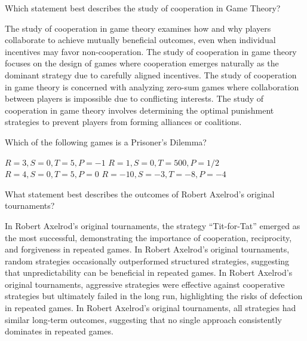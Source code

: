 \documentclass{exam}
\begin{document}
\begin{questions}
        
    \question
    Which statement best describes the study of cooperation in Game Theory?

    \begin{checkboxes}
        \choice The study of cooperation in game theory examines how and why players collaborate to achieve mutually beneficial outcomes, even when individual incentives may favor non-cooperation.
        \choice The study of cooperation in game theory focuses on the design of games where cooperation emerges naturally as the dominant strategy due to carefully aligned incentives.            
        \choice The study of cooperation in game theory is concerned with analyzing zero-sum games where collaboration between players is impossible due to conflicting interests.
        \choice The study of cooperation in game theory involves determining the optimal punishment strategies to prevent players from forming alliances or coalitions.
    \end{checkboxes}

    \question
    Which of the following games is a Prisoner's Dilemma?

    \begin{checkboxes}
        \choice \(R=3, S=0, T=5, P=-1\)
        \choice \(R=1, S=0, T=500, P=1/2\)
        \choice \(R=4, S=0, T=5, P=0\)
        \choice \(R=-10, S=-3, T=-8, P=-4\)
    \end{checkboxes}

    \question What statement best describes the outcomes of Robert Axelrod's
    original tournaments?

    \begin{checkboxes}
        \choice In Robert Axelrod's original tournaments, the strategy ``Tit-for-Tat'' emerged as the most successful, demonstrating the importance of cooperation, reciprocity, and forgiveness in repeated games.
        \choice In Robert Axelrod's original tournaments, random strategies occasionally outperformed structured strategies, suggesting that unpredictability can be beneficial in repeated games.
        \choice In Robert Axelrod's original tournaments, aggressive strategies were effective against cooperative strategies but ultimately failed in the long run, highlighting the risks of defection in repeated games.
        \choice In Robert Axelrod's original tournaments, all strategies had similar long-term outcomes, suggesting that no single approach consistently dominates in repeated games.
    \end{checkboxes}

\end{questions}
\end{document}
